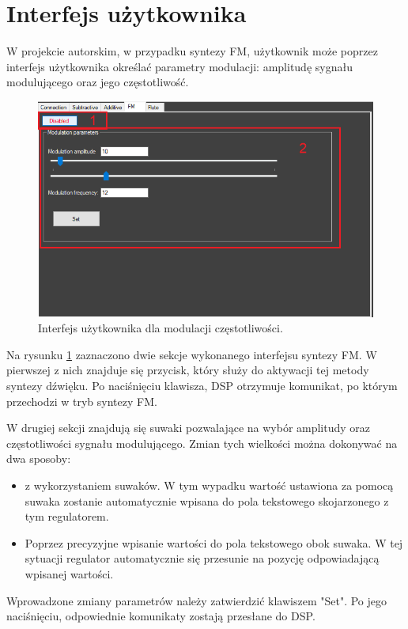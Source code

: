\section{Interfejs użytkownika}
W projekcie autorskim, w przypadku syntezy FM, użytkownik może poprzez interfejs użytkownika określać parametry modulacji: amplitudę sygnału modulującego oraz jego częstotliwość.
\begin{figure}[H]
	\centering
	\includegraphics[width=12cm]{grafiki/fm_interface}
	\captionsetup{justification=centering}
	\caption{Interfejs użytkownika dla modulacji częstotliwości.}
	\label{rys:fm_interface}
\end{figure}
Na rysunku \ref{rys:fm_interface} zaznaczono dwie sekcje wykonanego interfejsu syntezy FM. W pierwszej z nich znajduje się przycisk, który służy do aktywacji tej metody syntezy dźwięku. Po naciśnięciu klawisza, DSP otrzymuje komunikat, po którym przechodzi w tryb syntezy FM.

W drugiej sekcji znajdują się suwaki pozwalające na wybór amplitudy oraz częstotliwości sygnału modulującego. Zmian tych wielkości można dokonywać na dwa sposoby:
\begin{itemize}
	\item z wykorzystaniem suwaków. W tym wypadku wartość ustawiona za pomocą suwaka zostanie automatycznie wpisana do pola tekstowego skojarzonego z tym regulatorem.
	\item Poprzez precyzyjne wpisanie wartości do pola tekstowego obok suwaka. W tej sytuacji regulator automatycznie się przesunie na pozycję odpowiadającą wpisanej wartości.
\end{itemize}
Wprowadzone zmiany parametrów należy zatwierdzić klawiszem "Set". Po jego naciśnięciu, odpowiednie komunikaty zostają przesłane do DSP.
